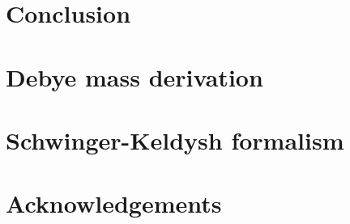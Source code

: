 \documentclass[12pt, a4paper, twoside]{book}
\begin{document}
\chapter{Conclusion}
\label{sec:conc}
\onehalfspacing

\begin{appendices}
\chapter{Debye mass derivation}
\chapter{Schwinger-Keldysh formalism}
\end{appendices}



\chapter*{Acknowledgements}


\cleardoublepage

\end{document}
